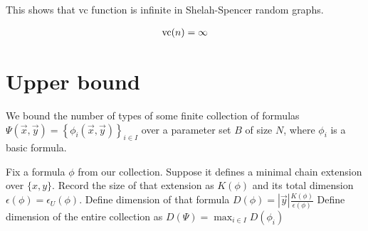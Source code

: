 \documentclass{amsart}
\newcommand{\curly}[1]{\left\{#1\right\}}
\begin{document}
This shows that vc function is infinite in Shelah-Spencer random graphs.

\begin{align*}
	\operatorname{vc}(n) = \infty
\end{align*}

\section{Upper bound}





%




We bound the number of types of some finite collection of formulas $\Psi(\vec x, \vec y) = \curly{\phi_i(\vec x, \vec y)}_{i\in I}$ over a parameter set $B$ of size $N$,
where $\phi_i$ is a basic formula.

Fix a formula $\phi$ from our collection.
Suppose it defines a minimal chain extension over $\{x, y\}$. 
Record the size of that extension as $K(\phi)$ and its total dimension $\epsilon(\phi) = \epsilon_U(\phi)$.
Define dimension of that formula $D(\phi) = |\vec y| \frac{K(\phi)}{\epsilon(\phi)}$
Define dimension of the entire collection as $D(\Psi) = \max_{i \in I} D(\phi_i)$
\end{document}
